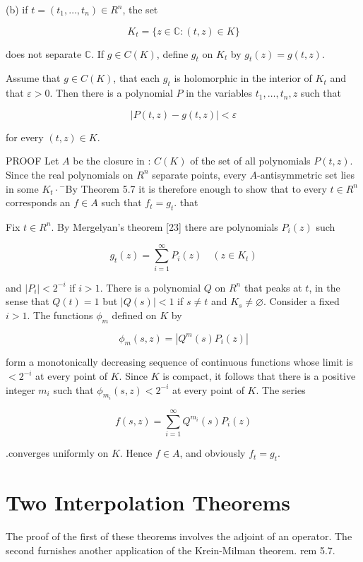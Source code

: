 \documentclass[10pt]{article}
\begin{document}
(b) if $t=\left(t_{1}, \ldots, t_{n}\right) \in R^{n}$, the set

$$
K_{t}=\{z \in \mathbb{C}:(t, z) \in K\}
$$

does not separate $\mathbb{C}$. If $g \in C(K)$, define $g_{t}$ on $K_{t}$ by $g_{t}(z)=g(t, z)$.

Assume that $g \in C(K)$, that each $g_{t}$ is holomorphic in the interior of $K_{t}$ and that $\varepsilon>0$. Then there is a polynomial $P$ in the variables $t_{1}, \ldots, t_{n}, z$ such that

$$
|P(t, z)-g(t, z)|<\varepsilon
$$

for every $(t, z) \in K$.

PROOF Let $A$ be the closure in : $C(K)$ of the set of all polynomials $P(t, z)$. Since the real polynomials on $R^{n}$ separate points, every $A$-antisymmetric set lies in
some $K_{t} \cdot{ }^{-}$By Theorem 5.7 it is therefore enough to show that to every $t \in R^{n}$ corresponds an $f \in A$ such that $f_{t}=g_{t}$. that

Fix $t \in R^{n}$. By Mergelyan's theorem [23] there are polynomials $P_{i}(z)$ such

$$
g_{t}(z)=\sum_{i=1}^{\infty} P_{i}(z) \quad\left(z \in K_{t}\right)
$$

and $\left|P_{i}\right|<2^{-i}$ if $i>1$. There is a polynomial $Q$ on $R^{n}$ that peaks at $t$, in the sense that $Q(t)=1$ but $|Q(s)|<1$ if $s \neq t$ and $K_{s} \neq \varnothing$. Consider a fixed $i>1$. The functions $\phi_{m}$ defined on $K$ by

$$
\phi_{m}(s, z)=\left|Q^{m}(s) P_{i}(z)\right|
$$

form a monotonically decreasing sequence of continuous functions whose limit is $<2^{-i}$ at every point of $K$. Since $K$ is compact, it follows that there is a positive integer $m_{i}$ such that $\phi_{m_{i}}(s, z)<2^{-i}$ at every point of $K$. The series

$$
f(s, z)=\sum_{i=1}^{\infty} Q^{m_{i}}(s) P_{i}(z)
$$

.converges uniformly on $K$. Hence $f \in A$, and obviously $f_{t}=g_{t}$.

\section{Two Interpolation Theorems}
The proof of the first of these theorems involves the adjoint of an operator. The second furnishes another application of the Krein-Milman theorem. rem 5.7.
\end{document}

